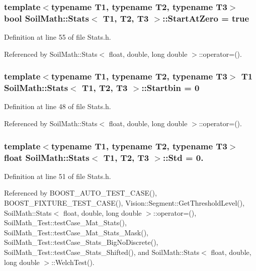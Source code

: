 \subsubsection[{Start\+At\+Zero}]{\setlength{\rightskip}{0pt plus 5cm}template$<$typename T1, typename T2, typename T3$>$ bool {\bf Soil\+Math\+::\+Stats}$<$ T1, T2, T3 $>$\+::Start\+At\+Zero = true}\label{class_soil_math_1_1_stats_a06f5e8404c2a0fa303dbb18a58d6deb5}


Definition at line 55 of file Stats.\+h.



Referenced by Soil\+Math\+::\+Stats$<$ float, double, long double $>$\+::operator=().

\hypertarget{class_soil_math_1_1_stats_acf54f4a105482109ebc884c8e56d0ba9}{}
\subsubsection[{Startbin}]{\setlength{\rightskip}{0pt plus 5cm}template$<$typename T1, typename T2, typename T3$>$ T1 {\bf Soil\+Math\+::\+Stats}$<$ T1, T2, T3 $>$\+::Startbin = 0}\label{class_soil_math_1_1_stats_acf54f4a105482109ebc884c8e56d0ba9}


Definition at line 48 of file Stats.\+h.



Referenced by Soil\+Math\+::\+Stats$<$ float, double, long double $>$\+::operator=().

\hypertarget{class_soil_math_1_1_stats_a6af590b7d033d882d5428c0d7a1f5e59}{}
\subsubsection[{Std}]{\setlength{\rightskip}{0pt plus 5cm}template$<$typename T1, typename T2, typename T3$>$ float {\bf Soil\+Math\+::\+Stats}$<$ T1, T2, T3 $>$\+::Std = 0.}\label{class_soil_math_1_1_stats_a6af590b7d033d882d5428c0d7a1f5e59}


Definition at line 51 of file Stats.\+h.



Referenced by B\+O\+O\+S\+T\+\_\+\+A\+U\+T\+O\+\_\+\+T\+E\+S\+T\+\_\+\+C\+A\+S\+E(), B\+O\+O\+S\+T\+\_\+\+F\+I\+X\+T\+U\+R\+E\+\_\+\+T\+E\+S\+T\+\_\+\+C\+A\+S\+E(), Vision\+::\+Segment\+::\+Get\+Threshold\+Level(), Soil\+Math\+::\+Stats$<$ float, double, long double $>$\+::operator=(), Soil\+Math\+\_\+\+Test\+::test\+Case\+\_\+\+Mat\+\_\+\+Stats(), Soil\+Math\+\_\+\+Test\+::test\+Case\+\_\+\+Mat\+\_\+\+Stats\+\_\+\+Mask(), Soil\+Math\+\_\+\+Test\+::test\+Case\+\_\+\+Stats\+\_\+\+Big\+No\+Discrete(), Soil\+Math\+\_\+\+Test\+::test\+Case\+\_\+\+Stats\+\_\+\+Shifted(), and Soil\+Math\+::\+Stats$<$ float, double, long double $>$\+::\+Welch\+Test().

